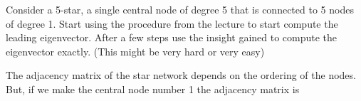 
Consider a 5-star, a single central node of degree 5 that is connected to 5 nodes of degree 1. Start using the procedure from the lecture to start compute the leading eigenvector. After a few steps use the insight gained to compute the eigenvector exactly. (This might be very hard or very easy)  

\solution
The adjacency matrix of the star network depends on the ordering of the nodes. But, if we make the central node number 1 the adjacency matrix is 

